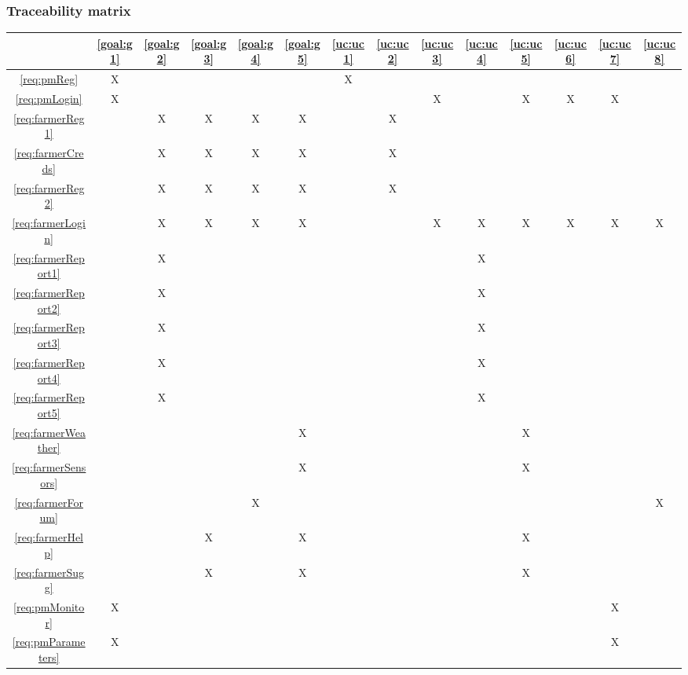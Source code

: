 \documentclass[10pt]{article}
\begin{document}
\subsubsection{Traceability matrix}
\begin{table}[]
    \begin{center}
    \begin{tabular}{|c|ccccc|cccccccc|}
    \hline
        & \ref{goal:g1} & \ref{goal:g2} & \ref{goal:g3} & \ref{goal:g4} & \ref{goal:g5} & \ref{uc:uc1} & \ref{uc:uc2} & \ref{uc:uc3} & \ref{uc:uc4} & \ref{uc:uc5} & \ref{uc:uc6} & \ref{uc:uc7} & \ref{uc:uc8} \\ \hline
    \ref{req:pmReg}  & X &  &  &  &  & X &  &  &  &  &  &  &  \\
    \ref{req:pmLogin}  & X &  &  &  &  &  &  & X &  & X & X & X &  \\
    \ref{req:farmerReg1}  &  & X & X & X & X &  & X &  &  &  &  &  &  \\
    \ref{req:farmerCreds}  &  & X & X & X & X &  & X &  &  &  &  &  &  \\
    \ref{req:farmerReg2}  &  & X & X & X & X &  & X &  &  &  &  &  &  \\
    \ref{req:farmerLogin}  &  & X & X & X & X &  &  & X & X & X & X & X & X \\
    \ref{req:farmerReport1}  &  & X &  &  &  &  &  &  & X &  &  &  &  \\
    \ref{req:farmerReport2}  &  & X &  &  &  &  &  &  & X &  &  &  &  \\
    \ref{req:farmerReport3}  &  & X &  &  &  &  &  &  & X &  &  &  &  \\
    \ref{req:farmerReport4}  &  & X &  &  &  &  &  &  & X &  &  &  &  \\
    \ref{req:farmerReport5}  &  & X &  &  &  &  &  &  & X &  &  &  &  \\
    \ref{req:farmerWeather}  &  &  &  &  & X &  &  &  &  & X &  &  &  \\
    \ref{req:farmerSensors}  &  &  &  &  & X &  &  &  &  & X &  &  &  \\
    \ref{req:farmerForum}  &  &  &  & X &  &  &  &  &  &  &  &  & X \\
    \ref{req:farmerHelp}  &  &  & X &  & X &  &  &  &  & X &  &  &  \\
    \ref{req:farmerSugg}  &  &  & X &  & X &  &  &  &  & X &  &  &  \\
    \ref{req:pmMonitor}  & X &  &  &  &  &  &  &  &  &  &  & X &  \\
    \ref{req:pmParameters}  & X &  &  &  &  &  &  &  &  &  &  & X &  \\

\end{tabular}
\end{center}
\end{table}
\end{document}
